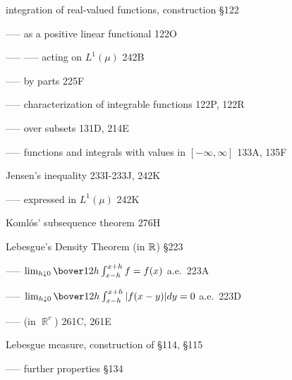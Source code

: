 integration of real-valued functions, construction \S122

----- as a positive linear functional 122O

----- ----- acting on $L^1(\mu)$ 242B

----- by parts 225F

----- characterization of integrable functions 122P, 122R

----- over subsets 131D, 214E

----- functions and integrals with values in $[-\infty,\infty]$ 133A, 135F




























\indexmedskip



Jensen's inequality 233I-233J, 242K

----- expressed in $L^1(\mu)$ 242K

\indexmedskip









Koml\'os' subsequence theorem 276H



\indexmedskip

Lebesgue's Density Theorem (in $\Bbb R$) \S223

----- $\lim_{h\downarrow 0}\bover1{2h}\int_{x-h}^{x+h}f=f(x)$ a.e.\
223A


-----
$\lim_{h\downarrow 0}\bover1{2h}\int_{x-h}^{x+h}|f(x-y)|dy=0$ a.e.\ 223D


----- (in $\BbbR^r$) 261C, 261E





Lebesgue measure, construction of \S114, \S115

----- further properties \S134



